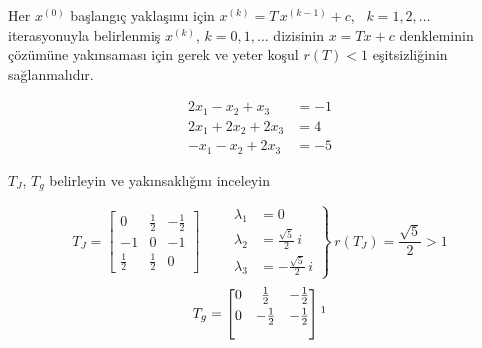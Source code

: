 \documentclass[11pt,a4paper]{article}
\begin{document}
\begin{teorem}
Her $x^{(0)}$ başlangıç yaklaşımı için $x^{(k)}=T\,x^{(k-1)}+c$, \ $k=1,2,\dots$ iterasyonuyla
belirlenmiş $x^{(k)}$, $k=0,1,\dots$ dizisinin $x=Tx+c$ denkleminin çözümüne yakınsaması için
gerek ve yeter koşul $r(T)<1$ eşitsizliğinin sağlanmalıdır.
\end{teorem}

\noindent\begin{minipage}[c]{0.5\linewidth}
\[
  \begin{aligned}
    2x_1-x_2+x_3&=-1\\
    2x_1+2x_2+2x_3&=4\\
    -x_1-x_2+2x_3&=-5
  \end{aligned}
\]
\end{minipage}\hfill
\begin{minipage}[c]{0.46\linewidth}
$T_J$, $T_g$ belirleyin ve yakınsaklığını inceleyin
\end{minipage}
\[
  T_J=\begin{bmatrix}0&\frac12&-\frac12\\[1mm]-1&0&-1\\[1mm]\frac12&\frac12&0\end{bmatrix}
  \qquad
  \left.\begin{aligned}
    \lambda_1&=0\\
    \lambda_2&=\tfrac{\sqrt5}{2}\,i\\
    \lambda_3&=-\tfrac{\sqrt5}{2}\,i
  \end{aligned}\right\}\ r(T_J)=\frac{\sqrt5}{2}>1
\]
\[
  T_g=\begin{bmatrix}0&\frac12&-\frac12\\[1mm]0&-\frac12&-\frac12\\ \phantom{0}&&\end{bmatrix}\footnotemark
\]
\end{document}
